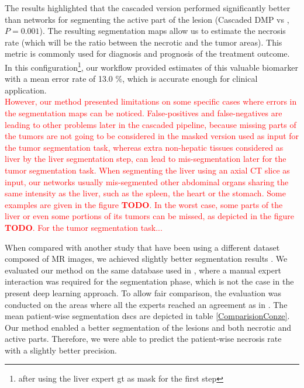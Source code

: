 The results highlighted that the cascaded version performed significantly better than  networks for segmenting the active part of the lesion (Cascaded DMP vs , $P = 0.001$).
The resulting segmentation maps allow us to estimate the necrosis rate (which will be the ratio between the necrotic and the tumor areas). This metric is commonly used for diagnosis and prognosis of the treatment outcome. In this configuration\footnote{after using the liver expert \ac{gt} as mask for the first step}, our workflow provided estimates of this valuable biomarker with a mean error rate of 13.0 \%, which is accurate enough for clinical application. \\


\textcolor{red}
{
However, our method presented limitations on some specific cases where errors in the segmentation maps can be noticed. 
False-positives and false-negatives are leading to other problems later in the cascaded pipeline, because missing parts of the tumors are not going to be considered in the masked version used as input for the tumor segmentation task, whereas extra non-hepatic tissues considered as liver by the liver segmentation step, can lead to mis-segmentation later for the tumor segmentation task.
When segmenting the liver using an axial CT slice as input, our networks usually mis-segmented other abdominal organs sharing the same intensity as the liver, such as the spleen, the heart or the stomach. Some examples are given in the figure \textbf{TODO}. 
In the worst case, some parts of the liver or even some portions of its tumors can be missed, as depicted in the figure \textbf{TODO}. 
For the tumor segmentation task...
}

When compared with another study that have been using a different dataset composed of MR images, we achieved slightly better segmentation results \cite{Zhang}.
We evaluated our method on the same database used in \cite{Conze2017}, where a manual expert interaction was required for the segmentation phase, which is not the case in the present deep learning approach. To allow fair comparison, the evaluation was conducted on the areas where all the experts reached an agreement as in \cite{Conze2017}. The mean patient-wise segmentation \ac{dsc}s are depicted in table \ref{ComparisionConze}. Our method enabled a better segmentation of the lesions and both necrotic and active parts. Therefore, we were able to predict the patient-wise necrosis rate with a slightly better precision. 

